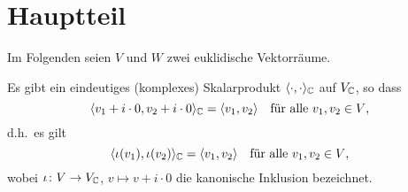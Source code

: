\documentclass[a4paper,10pt,numbers=noenddot]{scrartcl}
\begin{document}
\section{Hauptteil}


Im Folgenden seien $V$ und $W$ zwei euklidische Vektorräume.


\begin{proposition}
  Es gibt ein eindeutiges (komplexes) Skalarprodukt $\langle \cdot, \cdot \rangle_{\mathbb{C}}$ auf $V_{\mathbb{C}}$, so dass
  \[
      \langle v_1 + i \cdot 0, v_2 + i \cdot 0 \rangle_{\mathbb{C}}
    = \langle v_1, v_2 \rangle
    \quad
    \text{für alle $v_1, v_2 \in V$},
  \]
  d.h.\ es gilt
  \[
    \langle \iota(v_1), \iota(v_2) \rangle_{\mathbb{C}} = \langle v_1, v_2 \rangle
    \quad\text{für alle $v_1, v_2 \in V$},
  \]
  wobei $\iota \colon V \to V_{\mathbb{C}}$, $v \mapsto v + i \cdot 0$ die kanonische Inklusion bezeichnet.
\end{proposition}
\end{document}
